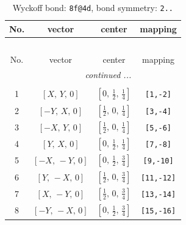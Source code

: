 \documentclass[fleqn,8pt]{jsarticle}
\begin{document}
\begin{longtable}{cccc}
\caption{Wyckoff bond: {\tt 8f@4d}, bond symmetry: {\tt 2..}}
 \\
 \hline \hline
No. & vector & center & mapping \\ \hline \endfirsthead

\multicolumn{3}{l}{\tablename\ \thetable{}} \\
 \hline \hline
No. & vector & center & mapping \\ \hline \endhead

 \hline \hline
\multicolumn{3}{r}{\footnotesize\it continued ...} \\ \endfoot

 \hline \hline
\multicolumn{3}{r}{} \\ \endlastfoot

1 & $\left[ X,\, Y,\, 0 \right]$ & $\left[ 0,\, \frac{1}{2},\, \frac{1}{4} \right]$ & {\tt [1,-2]} \\ \hline
2 & $\left[ - Y,\, X,\, 0 \right]$ & $\left[ \frac{1}{2},\, 0,\, \frac{1}{4} \right]$ & {\tt [3,-4]} \\ \hline
3 & $\left[ - X,\, Y,\, 0 \right]$ & $\left[ \frac{1}{2},\, 0,\, \frac{1}{4} \right]$ & {\tt [5,-6]} \\ \hline
4 & $\left[ Y,\, X,\, 0 \right]$ & $\left[ 0,\, \frac{1}{2},\, \frac{1}{4} \right]$ & {\tt [7,-8]} \\ \hline
5 & $\left[ - X,\, - Y,\, 0 \right]$ & $\left[ 0,\, \frac{1}{2},\, \frac{3}{4} \right]$ & {\tt [9,-10]} \\ \hline
6 & $\left[ Y,\, - X,\, 0 \right]$ & $\left[ \frac{1}{2},\, 0,\, \frac{3}{4} \right]$ & {\tt [11,-12]} \\ \hline
7 & $\left[ X,\, - Y,\, 0 \right]$ & $\left[ \frac{1}{2},\, 0,\, \frac{3}{4} \right]$ & {\tt [13,-14]} \\ \hline
8 & $\left[ - Y,\, - X,\, 0 \right]$ & $\left[ 0,\, \frac{1}{2},\, \frac{3}{4} \right]$ & {\tt [15,-16]} \\
\end{longtable}
\renewcommand{\arraystretch}{1.2}
\end{document}
